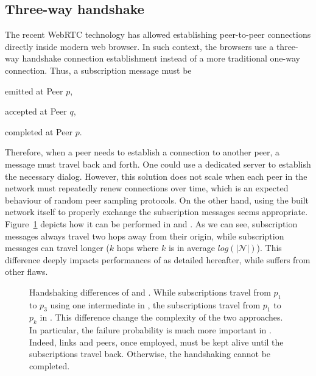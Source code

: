 \subsection{Three-way handshake}
The recent WebRTC technology has allowed establishing peer-to-peer connections
directly inside modern web browser. In such context, the browsers use a
three-way handshake connection establishment instead of a more traditional
one-way connection. Thus, a subscription message must be
\begin{inparaenum}[(1)]
\item emitted at Peer $p$,
\item accepted at Peer $q$,
\item completed at Peer $p$.
\end{inparaenum}
Therefore, when a peer needs to establish a connection to another peer, a
message must travel back and forth. One could use a dedicated server to
establish the necessary dialog. However, this solution does not scale when
each peer in the network must repeatedly renew connections over time, which is
an expected behaviour of random peer sampling protocols. On the other hand,
using the built network itself to properly exchange the subscription messages
seems appropriate. Figure~\ref{fig:handshakeexample} depicts how it can be
performed in \CYCLON{} and \SCAMP{}. As we can see, \CYCLON{} subscription
messages always travel two hops away from their origin, while \SCAMP{}
subscription messages can travel longer ($k$ hops where $k$ is in average
$log(|\mathcal{N}|)$).  This difference deeply impacts performances of \SCAMP{}
as detailed hereafter, while \CYCLON{} suffers from other flaws.

\begin{figure}
  \centering
  
  \caption{\label{fig:handshakeexample}Handshaking differences of \CYCLON{} and
    \SCAMP{}. While subscriptions travel from $p_1$ to $p_3$ using one
    intermediate in \CYCLON{}, the subscriptions travel from $p_1$ to $p_k$ in
    \SCAMP{}. This difference change the complexity of the two approaches. In
    particular, the failure probability is much more important in
    \SCAMP{}. Indeed, links and peers, once employed, must be kept alive until
    the subscriptions travel back. Otherwise, the handshaking cannot be
    completed.}
\end{figure}


